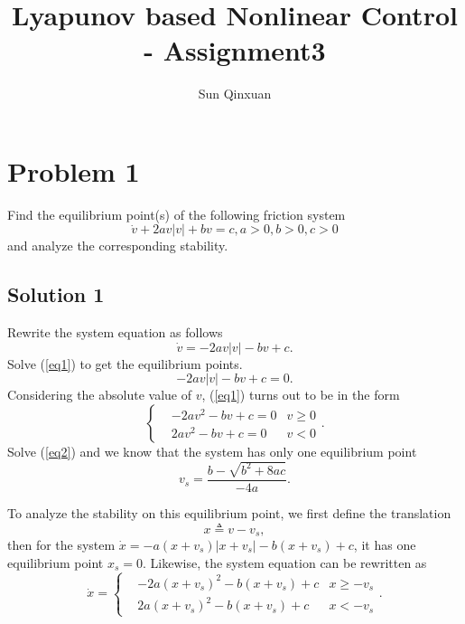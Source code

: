 \documentclass[12pt,a4paper]{article}
\title{Lyapunov based Nonlinear Control - Assignment3}
\author{Sun Qinxuan}
\begin{document}
\maketitle

\section*{Problem 1}

\indent Find the equilibrium point(s) of the following friction system
$$\dot{v}+2av|v|+bv=c,a>0,b>0,c>0$$
and analyze the corresponding stability.

\subsection*{Solution 1}

\indent Rewrite the system equation as follows
\begin{equation}
\dot{v}=-2av|v|-bv+c.
\end{equation}
Solve (\ref{eq1}) to get the equilibrium points.
\begin{equation}
-2av|v|-bv+c=0 .
\label{eq1}
\end{equation}
Considering the absolute value of $v$, (\ref{eq1}) turns out to be in the form
\begin{equation}
\left\{
    \begin{aligned}
    &-2av^2-bv+c=0 &v\ge 0\\
    &2av^2-bv+c=0 &v<0
    \end{aligned}
\right. .
\label{eq2}
\end{equation}
Solve (\ref{eq2}) and we know that the system has only one equilibrium point
\begin{equation}
v_s=\frac{b-\sqrt{b^2+8ac}}{-4a}.
\label{vs}
\end{equation}

\indent To analyze the stability on this equilibrium point, we first define the translation
\begin{equation}
x\triangleq v-v_s,
\end{equation}
then for the system $\dot{x}=-a(x+v_s)|x+v_s|-b(x+v_s)+c$, it has one equilibrium point $x_s=0$. Likewise, the system equation can be rewritten as
\begin{equation}
\dot{x}=
\left\{
    \begin{aligned}
    &-2a(x+v_s)^2-b(x+v_s)+c &x\ge -v_s\\
    &2a(x+v_s)^2-b(x+v_s)+c &x<-v_s
    \end{aligned}
\right. .
\label{eq3}
\end{equation}
\end{document}
